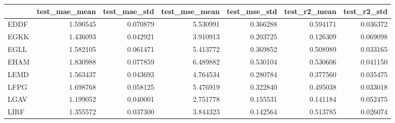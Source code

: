 \begin{tabular}{lrrrrrr}
\toprule
{} &  test_mae_mean &  test_mae_std &  test_mse_mean &  test_mse_std &  test_r2_mean &  test_r2_std \\
\midrule
EDDF &       1.590545 &      0.070879 &       5.530991 &      0.366288 &      0.594171 &     0.036372 \\
EGKK &       1.436093 &      0.042921 &       3.910913 &      0.203725 &      0.126309 &     0.069098 \\
EGLL &       1.582105 &      0.061471 &       5.413772 &      0.369852 &      0.508989 &     0.033165 \\
EHAM &       1.830988 &      0.077859 &       6.489882 &      0.530104 &      0.530606 &     0.041150 \\
LEMD &       1.563437 &      0.043693 &       4.764534 &      0.280784 &      0.377560 &     0.035475 \\
LFPG &       1.698768 &      0.058125 &       5.476919 &      0.322840 &      0.495038 &     0.033018 \\
LGAV &       1.199052 &      0.040001 &       2.751778 &      0.155531 &      0.141184 &     0.052475 \\
LIRF &       1.355572 &      0.037300 &       3.844323 &      0.142564 &      0.513785 &     0.026074 \\
\bottomrule
\end{tabular}
